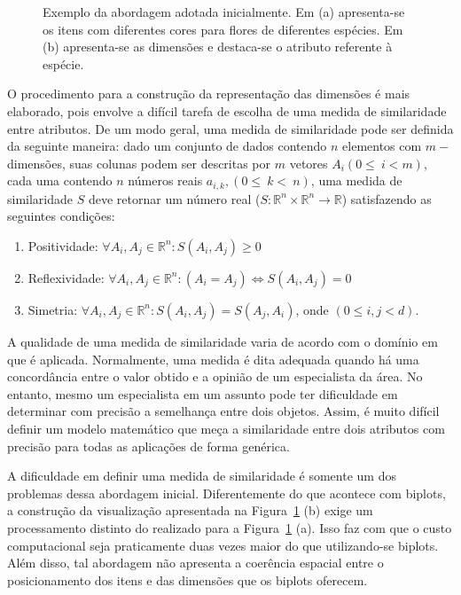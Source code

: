 \begin{figure}[h!]
\begin{subfigure}[b]{0.45\textwidth}
\begin{framed}
        \end{framed}
        \caption{}
    \end{subfigure} 
    \caption{Exemplo da abordagem adotada inicialmente. Em
        (a) apresenta-se os itens com diferentes cores para
        flores de diferentes espécies. Em (b) apresenta-se
        as dimensões e destaca-se o atributo referente à
        espécie.}
    \label{fig:dual}
\end{figure}

O procedimento para a construção da representação das
dimensões é mais elaborado, pois envolve a difícil tarefa de
escolha de uma medida de similaridade entre atributos. De um
modo geral, uma medida de similaridade pode ser definida da
seguinte maneira: dado um conjunto de dados contendo $n$
elementos com $m-$dimensões, suas colunas podem ser
descritas por $m$ vetores $A_i(0\leq~i<m)$, cada uma
contendo $n$ números reais $a_{i,k},(0\leq~k<~n)$, uma
medida de similaridade $S$ deve retornar um número real
($S:\mathbb{R}^n\times \mathbb{R}^n\rightarrow\mathbb{R}$)
satisfazendo as seguintes condições:

\begin{enumerate}

    \item Positividade: $\forall A_i,A_j \in \mathbb{R}^n:
        S(A_i,A_j) \geq 0 $

    \item Reflexividade: $\forall A_i,A_j \in
        \mathbb{R}^n: (A_i = A_j) \Leftrightarrow
        S(A_i,A_j) = 0 $

    \item Simetria: $\forall A_i,A_j \in
        \mathbb{R}^n: S(A_i,A_j) =
        S(A_j,A_i)$, onde $(0 \leq i,j <
        d)$.

\end{enumerate}

A qualidade de uma medida de similaridade varia de
acordo com o domínio em que é aplicada. Normalmente, uma
medida é dita adequada quando há uma concordância entre o
valor obtido e a opinião de um especialista da área. No
entanto, mesmo um especialista em um assunto pode ter
dificuldade em determinar com precisão a semelhança entre
dois objetos. Assim, é muito difícil definir um modelo
matemático que meça a similaridade entre dois atributos com
precisão para todas as aplicações de forma genérica. 

A dificuldade em definir uma medida de similaridade é
somente um dos problemas dessa abordagem inicial.
Diferentemente do que acontece com biplots, a construção da
visualização apresentada na Figura~\ref{fig:dual} (b) exige
um processamento distinto do realizado para a
Figura~\ref{fig:dual} (a). Isso faz com que o custo
computacional seja praticamente duas vezes maior do que
utilizando-se biplots. Além disso, tal abordagem não
apresenta a coerência espacial entre o posicionamento dos
itens e das dimensões que os biplots oferecem.


